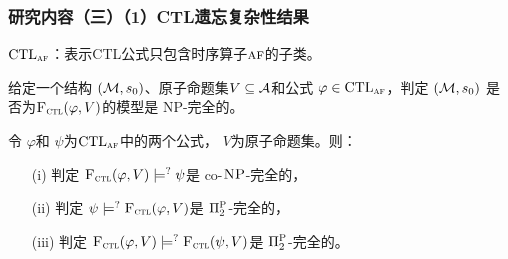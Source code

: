 \documentclass[aspectratio=1610, 9pt, CJK]{beamer}
\begin{document}
\begin{frame}
	\frametitle{研究内容（三）（1）CTL遗忘复杂性结果}
		$\textrm{CTL}_{\textsc{a}\textsc{f}}$：表示CTL公式只包含时序算子$\textsc{a} \textsc{f}$的子类。
		\begin{proposition}[模型检测]
			\label{modelChecking}
			给定一个结构 $({\cal M},s_0)$、原子命题集$V\subseteq{\cal A}$和公式 $\varphi \in \textrm{CTL}_{\textsc{a}\textsc{f}}$，判定 $({\cal M},s_0)$ 是否为${\textsc{F}_{\textsc{ctl}}}(\varphi, V)$的模型是 \textsc{NP}-完全的。
		\end{proposition}
		\begin{theorem}[Entailment]
			\label{thm:comF}
			令 $\varphi$和 $\psi$为$\textrm{CTL}_{\textsc{a} \textsc{f}}$中的两个公式， $V$为原子命题集。则：
			\begin{itemize}
				\item[(i)] 判定  ${\textsc{F}_{\textsc{ctl}}}(\varphi, V ) \models^? \psi$是 co-$\textsc{NP}$-完全的，
				\item[(ii)] 判定  $\psi \models^? {\textsc{F}_{\textsc{ctl}}}(\varphi, V)$是 $\Pi_2^{\textsc{P}}$-完全的，
				\item[(iii)] 判定 ${\textsc{F}_{\textsc{ctl}}}(\varphi, V) \models^? {\textsc{F}_{\textsc{ctl}}}(\psi, V)$是 $\Pi_2^{\textsc{P}}$-完全的。
			\end{itemize}
		\end{theorem}
\end{frame}
\end{document}
